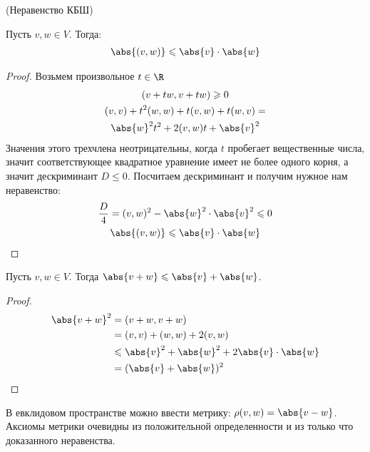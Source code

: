 \begin{theorem-non}
    (Неравенство КБШ) 

    Пусть $v, w \in V$. Тогда: 
    \begin{gather*}
        \abs{(v, w)} \leqslant  \abs{v} \cdot \abs{w}
    \end{gather*}
\end{theorem-non}
\begin{proof}
    Возьмем произвольное $t \in \R$ 
    \begin{gather*}
        (v + tw, v + tw) \geqslant 0 \\
        (v, v) + t^2 (w, w) + t (v, w) + t (w, v) = \\
        \abs{w}^2 t^2 + 2 (v, w) t + \abs{v}^2
    \end{gather*}
    Значения этого трехчлена неотрицательны, когда $t$ пробегает вещественные числа, значит соответствующее 
    квадратное уравнение имеет не более одного корня, а значит дескриминант $D \leqslant 0$.
    Посчитаем дескриминант и получим нужное нам неравенство: 
    \begin{gather*}
        \frac{D}{4} = (v, w)^2 - \abs{w}^2 \cdot \abs{v}^2 \leqslant 0 \\
        \abs{(v, w)} \leqslant  \abs{v} \cdot \abs{w}
    \end{gather*} 
\end{proof}
\follow Пусть $v, w \in V$. Тогда $\abs{v + w} \leqslant \abs{v} + \abs{w}$.
\begin{proof}
    \begin{align*}
        \abs{v + w}^2 &= (v + w, v + w) \\
        &= (v, v) + (w, w) + 2(v, w) \\
        &\leqslant \abs{v}^2 + \abs{w}^2 + 2\abs{v} \cdot \abs{w} \\
        &= (\abs{v} + \abs{w})^2
    \end{align*}
\end{proof}

\notice В евклидовом пространстве можно ввести метрику: $\rho(v, w) = \abs{v - w}$. Аксиомы метрики очевидны из положительной определенности 
и из только что доказанного неравенства.

